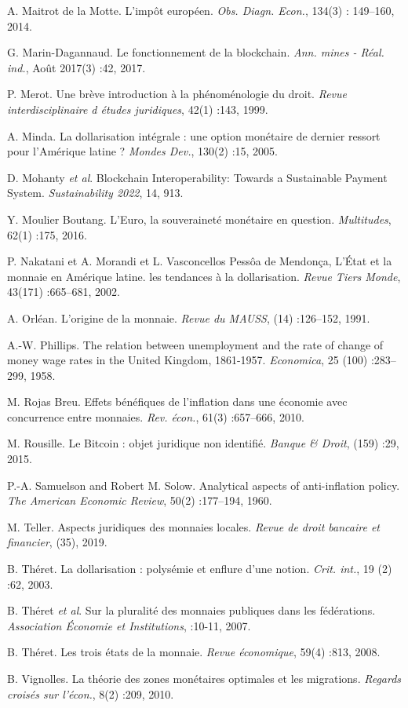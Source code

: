 {A. Maitrot de la Motte. L'impôt européen. \emph{Obs. Diagn. Econ.}, 134(3) : 149–160, 2014.\par
G. Marin-Dagannaud. Le fonctionnement de la blockchain. \emph{Ann. mines - Réal. ind.}, Août 2017(3) :42, 2017.\par
P. Merot. Une brève introduction à la phénoménologie du droit. \emph{Revue interdisciplinaire d études juridiques}, 42(1) :143, 1999.\par
A. Minda. La dollarisation intégrale : une option monétaire de dernier ressort pour l'Amérique latine ? \emph{Mondes Dev.}, 130(2) :15, 2005.\par
D. Mohanty \emph{et al}. Blockchain Interoperability: Towards a Sustainable Payment System. \emph{Sustainability 2022}, 14, 913.\par
Y. Moulier Boutang. L'Euro, la souveraineté monétaire en question. \emph{Multitudes}, 62(1) :175, 2016.\par
P. Nakatani et A. Morandi et L. Vasconcellos Pessôa de Mendonça,  L'État et la monnaie en Amérique latine. les tendances à la dollarisation. \emph{Revue Tiers Monde}, 43(171) :665–681, 2002.\par
A. Orléan. L'origine de la monnaie. \emph{Revue du MAUSS}, (14) :126–152, 1991.\par
A.-W. Phillips. The relation between unemployment and the rate of change of money wage rates in the United Kingdom, 1861-1957. \emph{Economica}, 25 (100) :283–299, 1958.\par
M. Rojas Breu. Effets bénéfiques de l'inflation dans une économie avec concurrence entre monnaies. \emph{Rev. écon.}, 61(3) :657–666, 2010.\par
M. Rousille. Le Bitcoin : objet juridique non identifié. \emph{Banque \& Droit}, (159) :29, 2015.\par
P.-A. Samuelson and Robert M. Solow. Analytical aspects of anti-inflation policy. \emph{The American Economic Review}, 50(2) :177–194, 1960.\par
M. Teller. Aspects juridiques des monnaies locales. \emph{Revue de droit bancaire et financier}, (35), 2019.\par
B. Théret. La dollarisation : polysémie et enflure d'une notion. \emph{Crit. int.}, 19 (2) :62, 2003.\par
B. Théret \emph{et al}. Sur la pluralité des monnaies publiques dans les fédérations. \emph{Association Économie et Institutions}, :10-11, 2007.\par
B. Théret. Les trois états de la monnaie. \emph{Revue économique}, 59(4) :813, 2008.\par
B. Vignolles. La théorie des zones monétaires optimales et les migrations. \emph{Regards croisés sur l'écon.}, 8(2) :209, 2010.\par

}
